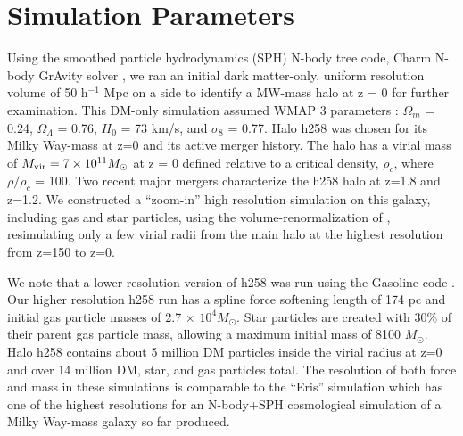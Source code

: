 \documentclass[]{emulateapj}
\begin{document}



\section{Simulation Parameters}\label{sec-model}

Using the smoothed particle hydrodynamics (SPH) N-body tree code, Charm N-body GrAvity solver \citep[ChaNGa;][]{Menon2015}, we ran an initial dark matter-only, uniform resolution volume of 50 h$^{-1}$ Mpc on a side to identify a MW-mass halo at z = 0 for further examination. This DM-only simulation assumed WMAP 3 parameters \citep{Spergel2007}: $\Omega_m$ = 0.24, $\Omega_{\Lambda}$ = 0.76, $H_0$ = 73 km/s, and $\sigma _8$ = 0.77. Halo h258 was chosen for its Milky Way-mass at z=0 and its active merger history. The halo has a virial mass of $M_{\rm vir} = 7 \times 10^{11} M_{\odot}$ at z = 0 defined relative to a critical density, $\rho_c$, where $\rho / \rho_c$ = 100. Two recent major mergers characterize the h258 halo at z=1.8 and z=1.2. We constructed a ``zoom-in'' high resolution simulation on this galaxy, including gas and star particles, using the volume-renormalization of \cite{Katz1993}, resimulating only a few virial radii from the main halo at the highest resolution from z=150 to z=0.  

We note that a lower resolution version of h258 was run using the Gasoline code \citep{Wadsley2004}. Our higher resolution h258 run has a spline force softening length of 174 pc and initial gas particle masses of 2.7 $\times$ $10^4 M_{\odot}$. Star particles are created with 30$\%$ of their parent gas particle mass, allowing a maximum initial mass of 8100 $M_{\odot}$. Halo h258 contains about 5 million DM particles inside the virial radius at z=0 and over 14 million DM, star, and gas particles total. The resolution of both force and mass in these simulations is comparable to the ``Eris'' simulation which has one of the highest resolutions for an N-body+SPH cosmological simulation of a Milky Way-mass galaxy so far produced.  
\end{document}
